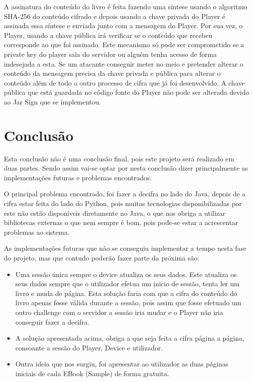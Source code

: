 \documentclass[pdftex,12pt,a4paper]{report}
\begin{document}
A assinatura do conteúdo do livro é feita fazendo uma síntese usando o algoritmo SHA-256 do conteúdo cifrado e depois usando a chave privada do Player é assinada essa síntese e enviada junto com a mensagem do Player. Por sua vez, o Player, usando a chave pública irá verificar se o conteúdo que recebeu corresponde ao que foi assinado.
Este mecanismo só pode ser comprometido se a private key do player saia do servidor ou alguém tenha acesso de forma indesejada a esta. Se um atacante conseguir meter no meio e pretender alterar o conteúdo da mensagem precisa da chave privada e pública para alterar o conteúdo além de todo o outro processo de cifra que já foi desenvolvido. 
A chave pública que está guardada no código fonte do Player não pode ser alterada devido ao Jar Sign que se implementou.

\newpage
\section{Conclusão}

Esta conclusão não é uma conclusão final, pois este projeto será realizado em duas partes.
Sendo assim vai-se optar por nesta conclusão dizer principalmente as implementações futuras e problemas encontrados.

O principal problema encontrado, foi fazer a decifra no lado do Java, depois de a cifra estar feita do lado do Python, pois muitas tecnologias disponibilizadas por este não estão disponíveis diretamente no Java, o que nos obriga a utilizar bibliotecas externas o que nem sempre é bom, pois pode-se estar a acrescentar problemas ao sistema. 

As implementações futuras que não se conseguiu implementar a tempo nesta fase do projeto, mas que contudo poderão fazer parte da próxima são:
\begin{itemize}
\item Uma sessão única sempre o device atualiza os seus dados. Este atualiza os seus dados sempre que o utilizador efetua um inicio de sessão, tenta ler um livro e muda de página. Esta solução faria com que a cifra do conteúdo do livro apenas fosse válida durante a sessão, pois assim que fosse efetuado um outro challenge com o servidor a sessão iria mudar e o Player não iria conseguir fazer a decifra.
\item A solução apresentada acima, obriga a que seja feita a cifra página a página, consoante a sessão do Player, Device e utilizador.
\item Outra ideia que nos surgiu, foi apresentar ao utilizador as duas páginas iniciais de cada EBook (Sample) de forma gratuita.
\end{itemize}
\end{document}
